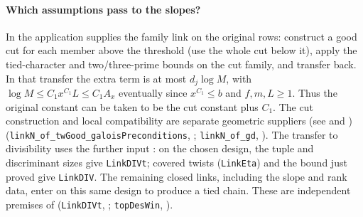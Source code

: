 \paragraph{Which assumptions pass to the slopes?}
In the application  supplies the family link on the original
rows: construct a good cut for each member above the threshold (use the
whole cut below it), apply the tied-character and two/three-prime bounds
on the cut family, and transfer back. In that transfer the extra term is at
most $d_j\log M$, with $\log M\le C_1x^{C_1}L\le C_1A_x$ eventually
since $x^{C_1}\le b$ and $f,m,L\ge1$. Thus the original constant can
be taken to be the cut constant plus $C_1$. The cut construction and local
compatibility are separate geometric suppliers (see  and )
(\nolinkurl{linkN_of_twGood_galoisPreconditions}, ;
\nolinkurl{linkN_of_gd}, ).
The transfer to divisibility uses the further input :
on the chosen design, the tuple and discriminant sizes give
\nolinkurl{LinkDIVt}; covered twists (\nolinkurl{LinkEta}) and the bound just
proved give \nolinkurl{LinkDIV}. The remaining closed links, including the
slope and rank data, enter on this same design to produce a tied chain.
These are independent premises of 
(\nolinkurl{LinkDIVt}, ;
\nolinkurl{topDesWin}, ).

